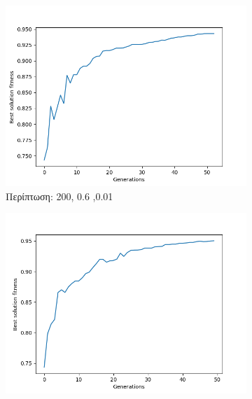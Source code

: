 \documentclass[12pt,a4paper]{article}
\begin{document}
\begin{enumerate}[a)]
\begin{figure}[H]
\begin{subfigure}[H]{0.7\textwidth}
                     \end{subfigure}
                 \end{figure}
                 \begin{figure}[H]
                     \centering
                     \begin{subfigure}[h]{0.7\textwidth}
                         \centering
                         \includegraphics[width=\textwidth]{images/7s.png}
                         \caption*{Περίπτωση: 200, 0.6 ,0.01}
                     \end{subfigure}
                     \begin{subfigure}[h]{0.7\textwidth}
                         \centering
                         \includegraphics[width=\textwidth]{images/8s.png}

\end{subfigure}
\end{figure}
\end{enumerate}
\end{document}
